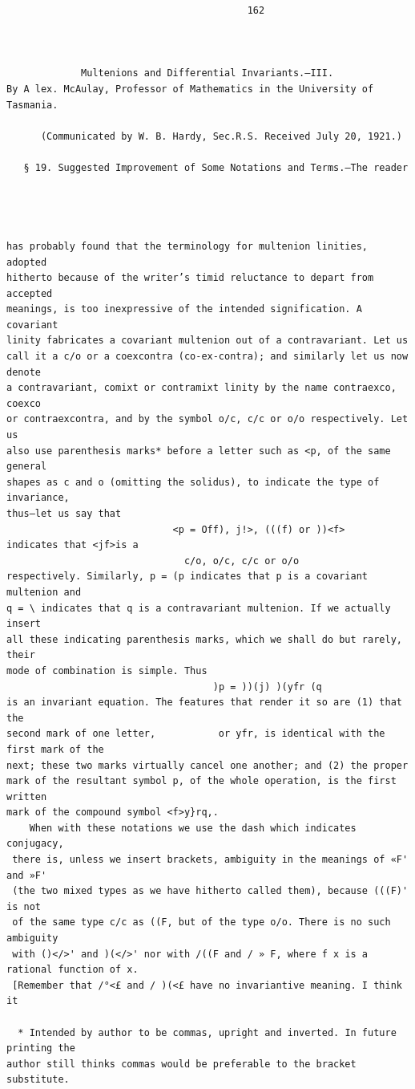 \documentclass[10pt]{article}
\begin{document}
\begin{verbatim}
                                          162



             Multenions and Differential Invariants.—III.
By A lex. McAulay, Professor of Mathematics in the University of Tasmania.

      (Communicated by W. B. Hardy, Sec.R.S. Received July 20, 1921.)

   § 19. Suggested Improvement of Some Notations and Terms.—The reader




has probably found that the terminology for multenion linities, adopted
hitherto because of the writer’s timid reluctance to depart from accepted
meanings, is too inexpressive of the intended signification. A covariant
linity fabricates a covariant multenion out of a contravariant. Let us
call it a c/o or a coexcontra (co-ex-contra); and similarly let us now denote
a contravariant, comixt or contramixt linity by the name contraexco, coexco
or contraexcontra, and by the symbol o/c, c/c or o/o respectively. Let us
also use parenthesis marks* before a letter such as <p, of the same general
shapes as c and o (omitting the solidus), to indicate the type of invariance,
thus—let us say that
                             <p = Off), j!>, (((f) or ))<f>
indicates that <jf>is a
                               c/o, o/c, c/c or o/o
respectively. Similarly, p = (p indicates that p is a covariant multenion and
q = \ indicates that q is a contravariant multenion. If we actually insert
all these indicating parenthesis marks, which we shall do but rarely, their
mode of combination is simple. Thus
                                    )p = ))(j) )(yfr (q
is an invariant equation. The features that render it so are (1) that the
second mark of one letter,           or yfr, is identical with the first mark of the
next; these two marks virtually cancel one another; and (2) the proper
mark of the resultant symbol p, of the whole operation, is the first written
mark of the compound symbol <f>y}rq,.
    When with these notations we use the dash which indicates conjugacy,
 there is, unless we insert brackets, ambiguity in the meanings of «F' and »F'
 (the two mixed types as we have hitherto called them), because (((F)' is not
 of the same type c/c as ((F, but of the type o/o. There is no such ambiguity
 with ()</>' and )(</>' nor with /((F and / » F, where f x is a rational function of x.
 [Remember that /°<£ and / )(<£ have no invariantive meaning. I think it

  * Intended by author to be commas, upright and inverted. In future printing the
author still thinks commas would be preferable to the bracket substitute.


\end{verbatim}
\end{document}
